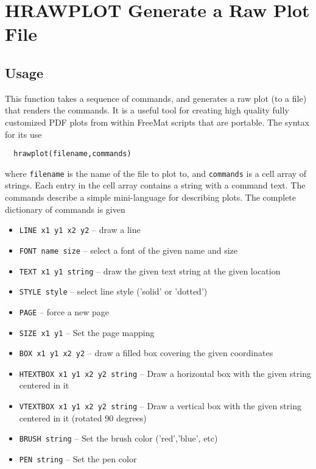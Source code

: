 \section{HRAWPLOT Generate a Raw Plot File}

\subsection{Usage}

This function takes a sequence of commands, and generates
a raw plot (to a file) that renders the commands.  It is 
a useful tool for creating high quality fully customized 
PDF plots from within FreeMat scripts that are portable.  The
syntax for its use 
\begin{verbatim}
  hrawplot(filename,commands)
\end{verbatim}
where \verb|filename| is the name of the file to plot to, 
and \verb|commands| is a cell array of strings.  Each entry in the 
cell array contains a string with a command text.  The
commands describe a simple mini-language for describing
plots.  The complete dictionary of commands is given
\begin{itemize}
\item  \verb|LINE x1 y1 x2 y2| -- draw a line

\item  \verb|FONT name size| -- select a font of the given name and size

\item  \verb|TEXT x1 y1 string| -- draw the given text string at the given location

\item  \verb|STYLE style| -- select line style ('solid' or 'dotted')

\item  \verb|PAGE| -- force a new page

\item  \verb|SIZE x1 y1| -- Set the page mapping

\item  \verb|BOX x1 y1 x2 y2| -- draw a filled box covering the given coordinates

\item  \verb|HTEXTBOX x1 y1 x2 y2 string| -- Draw a horizontal box with the given string centered in it

\item  \verb|VTEXTBOX x1 y1 x2 y2 string| -- Draw a vertical box with the given string centered in it (rotated 90 degrees)

\item  \verb|BRUSH string| -- Set the brush color ('red','blue', etc)

\item  \verb|PEN string| -- Set the pen color

\end{itemize}
